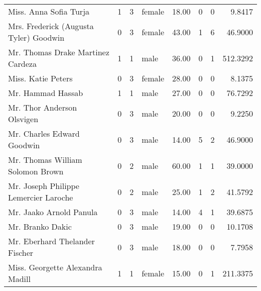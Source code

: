 \begin{tabular}{lrrlrrrr}
Miss. Anna Sofia Turja                             &         1 &       3 &  female &  18.00 &                        0 &                        0 &    9.8417 \\
Mrs. Frederick (Augusta Tyler) Goodwin             &         0 &       3 &  female &  43.00 &                        1 &                        6 &   46.9000 \\
Mr. Thomas Drake Martinez Cardeza                  &         1 &       1 &    male &  36.00 &                        0 &                        1 &  512.3292 \\
Miss. Katie Peters                                 &         0 &       3 &  female &  28.00 &                        0 &                        0 &    8.1375 \\
Mr. Hammad Hassab                                  &         1 &       1 &    male &  27.00 &                        0 &                        0 &   76.7292 \\
Mr. Thor Anderson Olsvigen                         &         0 &       3 &    male &  20.00 &                        0 &                        0 &    9.2250 \\
Mr. Charles Edward Goodwin                         &         0 &       3 &    male &  14.00 &                        5 &                        2 &   46.9000 \\
Mr. Thomas William Solomon Brown                   &         0 &       2 &    male &  60.00 &                        1 &                        1 &   39.0000 \\
Mr. Joseph Philippe Lemercier Laroche              &         0 &       2 &    male &  25.00 &                        1 &                        2 &   41.5792 \\
Mr. Jaako Arnold Panula                            &         0 &       3 &    male &  14.00 &                        4 &                        1 &   39.6875 \\
Mr. Branko Dakic                                   &         0 &       3 &    male &  19.00 &                        0 &                        0 &   10.1708 \\
Mr. Eberhard Thelander Fischer                     &         0 &       3 &    male &  18.00 &                        0 &                        0 &    7.7958 \\
Miss. Georgette Alexandra Madill                   &         1 &       1 &  female &  15.00 &                        0 &                        1 &  211.3375 \\

\end{tabular}
